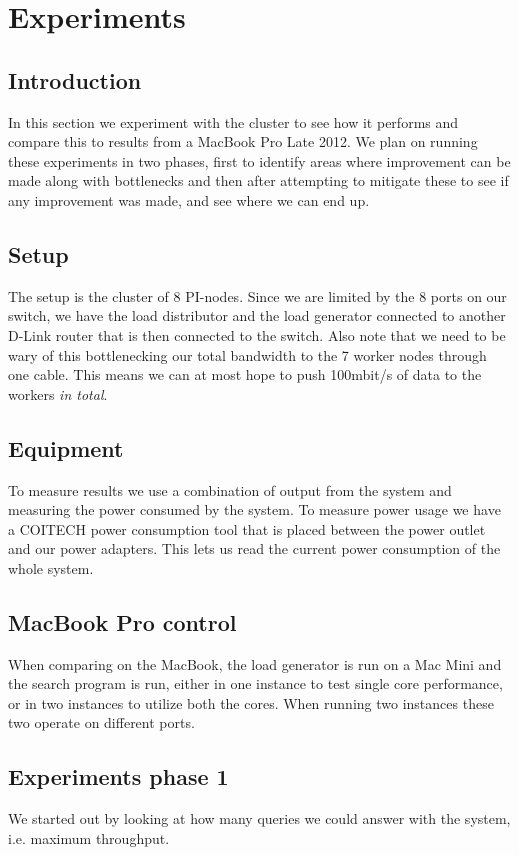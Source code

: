 
\clearpage
\section{Experiments}
\label{sec:experiments}

\subsection{Introduction}
In this section we experiment with the cluster to see how it performs and compare this to results from a MacBook Pro Late 2012. We plan on running these experiments in two phases, first to identify areas where improvement can be made along with bottlenecks and then after attempting to mitigate these to see if any improvement was made, and see where we can end up.

\subsection{Setup}
The setup is the cluster of 8 PI-nodes. Since we are limited by the 8 ports on our switch, we have the load distributor and the load generator connected to another D-Link router that is then connected to the switch.
Also note that we need to be wary of this bottlenecking our total bandwidth to the 7 worker nodes through one cable.
This means we can at most hope to push 100mbit/s of data to the workers {\em in total}.

\subsection{Equipment}
To measure results we use a combination of output from the system and measuring the power consumed by the system. To measure power usage we have a COITECH power consumption tool that is placed between the power outlet and our power adapters.
This lets us read the current power consumption of the whole system.

\subsection{MacBook Pro control}
When comparing on the MacBook, the load generator is run on a Mac Mini and the search program is run, either in one instance to test single core performance, or in two instances to utilize both the cores. When running two instances these two operate on different ports.

\subsection{Experiments phase 1}
We started out by looking at how many queries we could answer with the system, i.e. maximum throughput.

